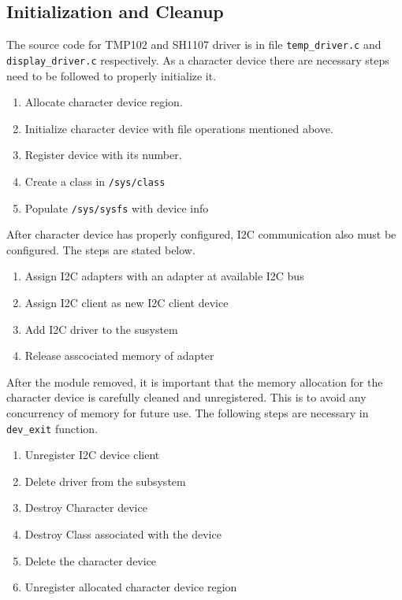 \subsection{Initialization and Cleanup}
The source code for TMP102 and SH1107 driver is in file \verb'temp_driver.c' and \verb'display_driver.c' respectively. As a character device there are necessary steps need to be followed to properly initialize it.

\begin{enumerate}
	\item Allocate character device region.
	\item Initialize character device with file operations mentioned above.
	\item Register device with its number.
	\item Create a class in \verb'/sys/class'
	\item Populate \verb'/sys/sysfs' with device info
\end{enumerate}

After character device has properly configured, I2C communication also must be configured. The steps are stated below.

\begin{enumerate}
	\item Assign I2C adapters with an adapter at available I2C bus
	\item Assign I2C client as new I2C client device
	\item Add I2C driver to the susystem
	\item Release asscociated memory of adapter
\end{enumerate}

After the module removed, it is important that the memory allocation for the character device is carefully cleaned and unregistered. This is to avoid any concurrency of memory for future use. The following steps are necessary in \verb'dev_exit' function.

\begin{enumerate}
	\item Unregister I2C device client
	\item Delete driver from the subsystem
	\item Destroy Character device
	\item Destroy Class associated with the device
	\item Delete the character device
	\item Unregister allocated character device region
\end{enumerate}

